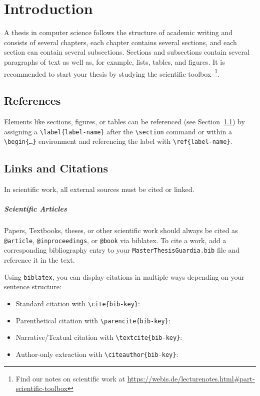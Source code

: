 \chapter{Introduction}\label{introduction}

A thesis in computer science follows the structure of academic writing and consists of several chapters, each chapter contains several sections, and each section can contain several subsections. Sections and subsections contain several paragraphs of text as well as, for example, lists, tables, and figures. It is recommended to start your thesis by studying the scientific toolbox~\footnote{Find our notes on scientific work at \url{https://webis.de/lecturenotes.html\#part-scientific-toolbox}}.

\enlargethispage{\baselineskip}

\section{References}\label{references}

Elements like sections, figures, or tables can be referenced (see Section~\ref{references}) by assigning a \texttt{\textbackslash label\{label-name\}} after the \texttt{\textbackslash section} command or within a \texttt{\textbackslash begin\{\dots\}} environment and referencing the label with \texttt{\textbackslash ref\{label-name\}}.

\section{Links and Citations}

In scientific work, all external sources must be cited or linked.

\paragraph{Scientific Articles} Papers, Textbooks, theses, or other scientific work should always be cited as \texttt{@article}, \texttt{@inproceedings}, or \texttt{@book} via biblatex. To cite a work, add a corresponding bibliography entry to your \texttt{MasterThesisGuardia.bib} file and reference it in the text.

Using \texttt{biblatex}, you can display citations in multiple ways depending on your sentence structure:
\begin{itemize}
    \item Standard citation with \texttt{\textbackslash cite\{bib-key\}}: \cite{kabanov51Attacks602026}
    \item Parenthetical citation with \texttt{\textbackslash parencite\{bib-key\}}: \parencite{manning:2001}
    \item Narrative/Textual citation with \texttt{\textbackslash textcite\{bib-key\}}: \textcite{manning:2001}
    \item Author-only extraction with \texttt{\textbackslash citeauthor\{bib-key\}}: \citeauthor{manning:2001}
\end{itemize}

